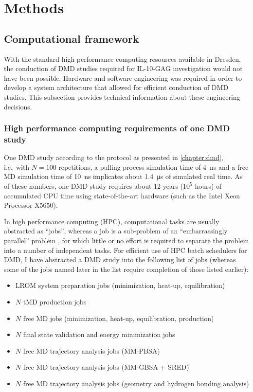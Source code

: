 
\section{Methods}

\subsection{Computational framework}

With the standard high performance computing resources available in Dresden, the
conduction of DMD studies required for IL-10-GAG investigation would not have
been possible. Hardware and software engineering was required in order to
develop a system architecture that allowed for efficient conduction of DMD
studies. This subsection provides technical information about these engineering
decisions.

\subsubsection{High performance computing requirements of one DMD study}

One DMD study according to the protocol as presented in \cref{chapter:dmd},
i.e.\ with $N = 100$ repetitions, a pulling process simulation time of
\SI{4}{\nano\second} and a free MD simulation time of \SI{10}{\nano\second}
implicates about \SI{1.4}{\micro\second} of simulated real time. As of these
numbers, one DMD study requires about 12 years ($10^5$ hours) of accumulated CPU
time using state-of-the-art hardware (such as the Intel Xeon Processor X5650).

In high performance computing (HPC), computational tasks are usually abstracted
as \enquote{jobs}, whereas a job is a sub-problem of an \enquote{embarrassingly
parallel} problem \cite{heath1986hypercube}, for which little or no effort is
required to separate the problem into a number of independent tasks. For
efficient use of HPC batch schedulers for DMD, I have abstracted a DMD study
into the following list of jobs (whereas some of the jobs named later in the
list require completion of those listed earlier):

\begin{itemize}
\item LROM system preparation jobs (minimization, heat-up, equilibration)
\item $N$ tMD production jobs
\item $N$ free MD jobs (minimization, heat-up, equilibration, production)
\item $N$ final state validation and energy minimization jobs
\item $N$ free MD trajectory analysis jobs (MM-PBSA)
\item $N$ free MD trajectory analysis jobs (MM-GBSA + SRED)
\item $N$ free MD trajectory analysis jobs (geometry and hydrogen bonding
analysis)
\end{itemize}

